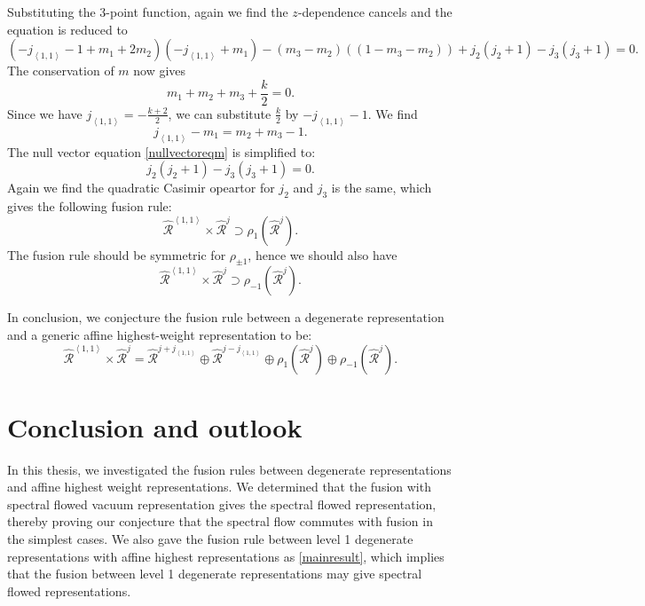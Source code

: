\documentclass[10pt,a4paper]{article}
\numberwithin{equation}{section}
\newcommand{\vev}[1]{\left\langle #1 \right\rangle}
\begin{document}
Substituting the 3-point function, again we find the $z$-dependence cancels and the equation is reduced to 
\begin{equation}
    (-j_{\vev{1,1}}-1+m_{1}+2m_{2})(-j_{\vev{1,1}}+m_{1}) - (m_{3}-m_{2})((1-m_{3}-m_{2})) + j_{2}(j_{2}+1) - j_{3}(j_{3}+1) = 0. \label{nullvectoreqm}
\end{equation}
The conservation of $m$ now gives 
\begin{equation}
    m_{1} + m_{2} + m_{3} + \frac{k}{2} = 0.
\end{equation}
Since we have $j_{\vev{1,1}} = -\frac{k+2}{2}$, we can substitute $\frac{k}{2}$ by $-j_{\vev{1,1}} - 1$. We find 
\begin{equation}
    j_{\vev{1,1}} - m_{1} = m_{2} + m_{3} - 1 . 
\end{equation}
The null vector equation \eqref{nullvectoreqm} is simplified to: 
\begin{equation}
    j_{2}(j_{2}+1) - j_{3}(j_{3}+1) = 0.
\end{equation}
Again we find the quadratic Casimir opeartor for $j_{2}$ and $j_{3}$ is the same, which gives the following fusion rule:
\begin{equation}
    \widehat{\mathcal{R}}^{\vev{1,1}} \times \widehat{\mathcal{R}}^{j} \supset \rho_{1} \left( \widehat{\mathcal{R}}^{j} \right).
\end{equation}
The fusion rule should be symmetric for $\rho_{\pm 1}$, hence we should also have 
\begin{equation}
    \widehat{\mathcal{R}}^{\vev{1,1}} \times \widehat{\mathcal{R}}^{j} \supset \rho_{-1} \left( \widehat{\mathcal{R}}^{j} \right).
\end{equation}

In conclusion, we conjecture the fusion rule between a degenerate representation and a generic affine highest-weight representation to be: 
\begin{equation}
    \boxed{
        \widehat{\mathcal{R}}^{\vev{1,1}} \times \widehat{\mathcal{R}}^{j} = \widehat{\mathcal{R}}^{j+j_{\vev{1,1}}} \oplus \widehat{\mathcal{R}}^{j-j_{\vev{1,1}}}
    \oplus \rho_{1} \left( \widehat{\mathcal{R}}^{j} \right) \oplus \rho_{-1} \left( \widehat{\mathcal{R}}^{j} \right).
    } \label{mainresult}
\end{equation}

\newpage

\section{Conclusion and outlook}
In this thesis, we investigated the fusion rules between degenerate representations and affine highest weight representations. 
We determined that the fusion with spectral flowed vacuum representation gives the spectral flowed representation, thereby proving our conjecture 
that the spectral flow commutes with fusion in the simplest cases. We also gave the fusion rule between level 1 degenerate representations 
with affine highest representations as \eqref{mainresult}, 
which implies that the fusion between level 1 degenerate representations may give spectral flowed representations.
\end{document}
